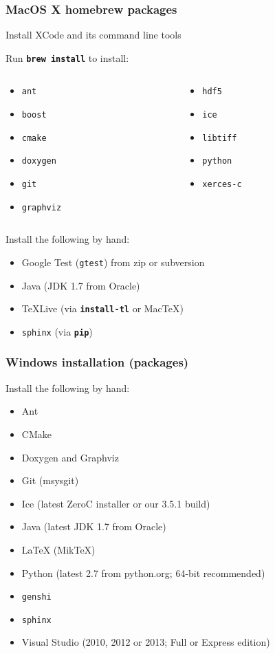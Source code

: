 \documentclass{beamer}
\newcommand{\cmd}[1]{\textbf{\texttt{#1}}}
\newcommand{\pkg}[1]{\texttt{#1}}
\begin{document}
\begin{frame}
  \frametitle{MacOS X homebrew packages}
  \scriptsize
  Install XCode and its command line tools
  \bigskip

  Run \cmd{brew install} to install:
  \begin{columns}
    \begin{column}{.5\linewidth}
      \begin{itemize}
      \item[] \pkg{ant}
      \item[] \pkg{boost}
      \item[] \pkg{cmake}
      \item[] \pkg{doxygen}
      \item[] \pkg{git}
      \item[] \pkg{graphviz}
      \end{itemize}
    \end{column}
    \begin{column}{.5\linewidth}
      \begin{itemize}
      \item[] \pkg{hdf5}
      \item[] \pkg{ice}
      \item[] \pkg{libtiff}
      \item[] \pkg{python}
      \item[] \pkg{xerces-c}
      \end{itemize}
    \end{column}
  \end{columns}
\bigskip
Install the following by hand:
\begin{itemize}
\item Google Test (\pkg{gtest}) from zip or subversion
\item Java (JDK 1.7 from Oracle)
\item \TeX{}Live (via \cmd{install-tl} or Mac\TeX{})
\item \pkg{sphinx} (via \cmd{pip})
\end{itemize}
\end{frame}

\begin{frame}
  \frametitle{Windows installation (packages)}
  Install the following by hand:
\begin{itemize}
\item Ant
\item CMake
\item Doxygen and Graphviz
\item Git (msysgit)
\item Ice (latest ZeroC installer or our 3.5.1 build)
\item Java (latest JDK 1.7 from Oracle)
\item \LaTeX{} (Mik\TeX{})
\item Python (latest 2.7 from python.org; 64-bit recommended)
\item \pkg{genshi}
\item \pkg{sphinx}
\item Visual Studio (2010, 2012 or 2013; Full or Express edition)
\end{itemize}
\end{frame}
\end{document}
